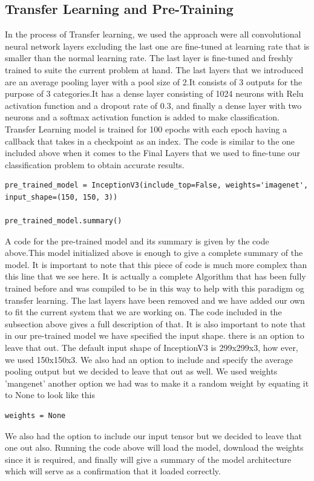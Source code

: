 \subsection{Transfer Learning and Pre-Training}
In the process of Transfer learning, we used the approach were all convolutional neural network layers excluding the last one are fine-tuned at learning rate that is smaller than the normal learning rate. The last layer is fine-tuned and freshly trained to suite the current  problem at hand. The last layers that we introduced are an average pooling layer with a pool size of 2.It consists of 3 outputs for the purpose of 3 categories.It has a dense layer consisting of 1024 neurons with Relu activation function and a dropout rate of 0.3, and finally a dense layer with two neurons and a softmax activation function is added to make classification. Transfer Learning model is trained for 100 epochs with each epoch having a callback that takes in a checkpoint as an index.
The code is similar to the one included above when it comes to the Final Layers that we used to fine-tune our classification problem to obtain accurate results.

\begin{lstlisting}
pre_trained_model = InceptionV3(include_top=False, weights='imagenet', input_shape=(150, 150, 3))

pre_trained_model.summary()
\end{lstlisting}
\vspace{4mm}

A code for the pre-trained model and its summary is given by the code above.This model initialized above is enough to give a complete summary of the model. It is important to note that this piece of code is much more complex than this line that we see here. It is actually a complete Algorithm that has been fully trained before and was compiled to be in this way to help with this paradigm og transfer learning. The last layers have been removed and we have added our own to fit the current system that we are working on. The code included in the subsection above gives a full description of that. It is also important to note that in our pre-trained model we have specified the input shape. there is an option to leave that out. The default input shape of InceptionV3 is 299x299x3, how ever, we used 150x150x3. We also had an option to include and specify the average pooling output but we decided to leave that out as well. We used weights 'mangenet' another option we had was to make it a random weight by equating it to None to look like this \begin{lstlisting}
weights = None
\end{lstlisting}
We also had the option to include our input tensor but we decided to leave that one out also. Running the code above will load the model, download the weights since it is required, and finally will give a summary of the model architecture which will serve as a confirmation that it loaded correctly.
   
